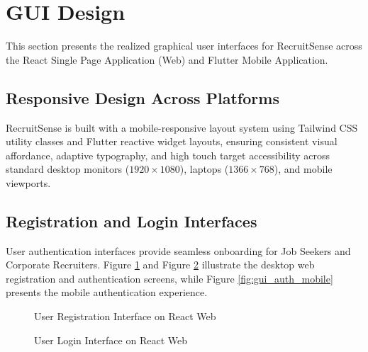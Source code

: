 \section{GUI Design}
This section presents the realized graphical user interfaces for RecruitSense across the React Single Page Application (Web) and Flutter Mobile Application.

\subsection{Responsive Design Across Platforms}
RecruitSense is built with a mobile-responsive layout system using Tailwind CSS utility classes and Flutter reactive widget layouts, ensuring consistent visual affordance, adaptive typography, and high touch target accessibility across standard desktop monitors ($1920\times1080$), laptops ($1366\times768$), and mobile viewports.

\subsection{Registration and Login Interfaces}
User authentication interfaces provide seamless onboarding for Job Seekers and Corporate Recruiters. Figure \ref{fig:gui_reg_web} and Figure \ref{fig:gui_login_web} illustrate the desktop web registration and authentication screens, while Figure \ref{fig:gui_auth_mobile} presents the mobile authentication experience.

\begin{figure}[h!]
\centering
{}
\caption{User Registration Interface on React Web}
\label{fig:gui_reg_web}
\end{figure}

\begin{figure}[h!]
\centering
{}
\caption{User Login Interface on React Web}
\label{fig:gui_login_web}
\end{figure}

